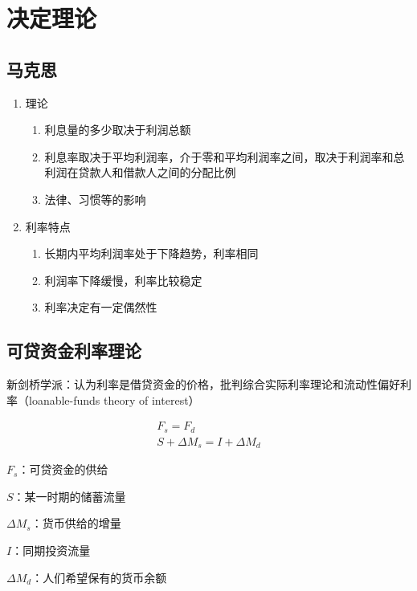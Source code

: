 \documentclass[12pt]{book}
\begin{document}
\section{决定理论}





\subsection{马克思}

\begin{enumerate}[1.]
    \item 理论
          \begin{enumerate}[(1)]
              \item 利息量的多少取决于利润总额
              \item 利息率取决于平均利润率，介于零和平均利润率之间，取决于利润率和总利润在贷款人和借款人之间的分配比例
              \item 法律、习惯等的影响
          \end{enumerate}
    \item 利率特点
          \begin{enumerate}[(1)]
              \item 长期内平均利润率处于下降趋势，利率相同
              \item 利润率下降缓慢，利率比较稳定
              \item 利率决定有一定偶然性
          \end{enumerate}
\end{enumerate}



\subsection{可贷资金利率理论}
新剑桥学派：认为利率是借贷资金的价格，批判综合实际利率理论和流动性偏好利率（loanable-funds theory of interest）

\begin{gather*}
    F_s=F_d\\
    S+\Delta M_s=I+\Delta M_d
\end{gather*}
\par $F_s$：可贷资金的供给
\par $S$：某一时期的储蓄流量
\par $ΔM_s$：货币供给的增量
\par $I$：同期投资流量
\par $\Delta M_d$：人们希望保有的货币余额
\end{document}
